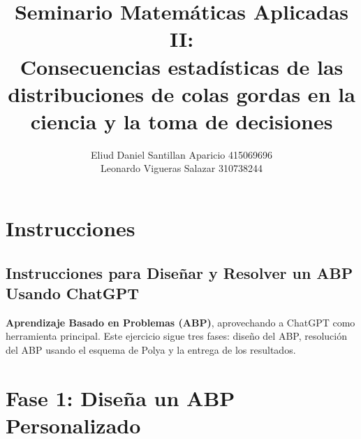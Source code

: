 \documentclass[a4paper,12pt]{article}
\title{\textbf{Seminario Matemáticas Aplicadas II:\\Consecuencias estadísticas de las distribuciones de colas gordas en la ciencia y la toma de decisiones}}
\author{Eliud Daniel Santillan Aparicio 415069696 \\ Leonardo Vigueras Salazar 310738244}
\date{}
\begin{document}
\maketitle
\section*{Instrucciones}

\subsection*{Instrucciones para Diseñar y Resolver un ABP Usando ChatGPT}

\textbf{Aprendizaje Basado en Problemas (ABP)}, aprovechando a ChatGPT como herramienta principal. Este ejercicio sigue tres fases: diseño del ABP, resolución del ABP usando el esquema de Polya y la entrega de los resultados.

\section*{Fase 1: Diseña un ABP Personalizado}
\end{document}
